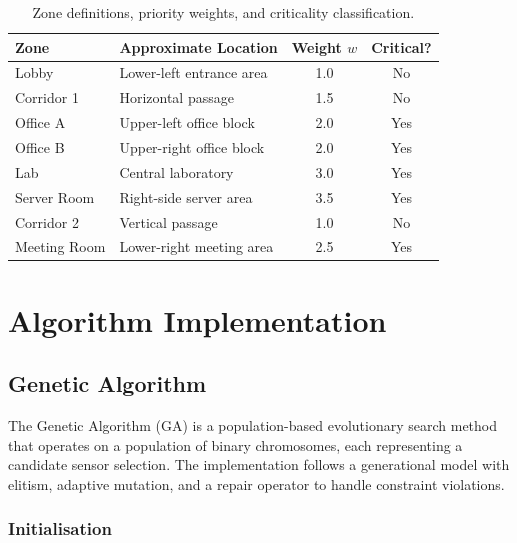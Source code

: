 \documentclass[12pt,a4paper]{article}
\begin{document}
\begin{table}[H]
  \centering
  \caption{Zone definitions, priority weights, and criticality classification.}
  \label{tab:zones}
  \begin{tabular}{llcc}
    \toprule
    \textbf{Zone} & \textbf{Approximate Location} & \textbf{Weight} $w$ & \textbf{Critical?} \\
    \midrule
    Lobby         & Lower-left entrance area  & 1.0 & No  \\
    Corridor 1    & Horizontal passage        & 1.5 & No  \\
    Office A      & Upper-left office block   & 2.0 & Yes \\
    Office B      & Upper-right office block  & 2.0 & Yes \\
    Lab           & Central laboratory        & 3.0 & Yes \\
    Server Room   & Right-side server area    & 3.5 & Yes \\
    Corridor 2    & Vertical passage          & 1.0 & No  \\
    Meeting Room  & Lower-right meeting area  & 2.5 & Yes \\
    \bottomrule
  \end{tabular}

\end{table}

\section{Algorithm Implementation}

\subsection{Genetic Algorithm}

The Genetic Algorithm (GA) is a population-based evolutionary search method that operates on a population of binary chromosomes, each representing a candidate sensor selection.
The implementation follows a generational model with elitism, adaptive mutation, and a repair operator to handle constraint violations.

\subsubsection*{Initialisation}
\end{document}
